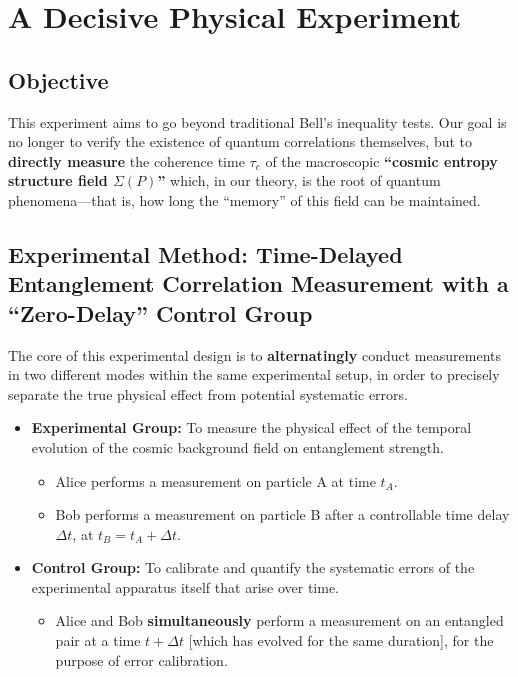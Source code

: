 \documentclass[11pt]{article}
\begin{document}
\section{A Decisive Physical Experiment}

\subsection{Objective}
This experiment aims to go beyond traditional Bell's inequality tests. Our goal is no longer to verify the existence of quantum correlations themselves, but to \textbf{directly measure} the coherence time $\tau_c$ of the macroscopic \textbf{``cosmic entropy structure field $\Sigma(P)$''} which, in our theory, is the root of quantum phenomena—that is, how long the ``memory'' of this field can be maintained.

\subsection{Experimental Method: Time-Delayed Entanglement Correlation Measurement with a ``Zero-Delay'' Control Group}
The core of this experimental design is to \textbf{alternatingly} conduct measurements in two different modes within the same experimental setup, in order to precisely separate the true physical effect from potential systematic errors.

\begin{itemize}
    \item   \textbf{Experimental Group:} To measure the physical effect of the temporal evolution of the cosmic background field on entanglement strength.
    \begin{itemize}
        \item   Alice performs a measurement on particle A at time $t_A$.
        \item   Bob performs a measurement on particle B after a controllable time delay $\Delta t$, at $t_B = t_A + \Delta t$.
    \end{itemize}

    \item   \textbf{Control Group:} To calibrate and quantify the systematic errors of the experimental apparatus itself that arise over time.
    \begin{itemize}
        \item   Alice and Bob \textbf{simultaneously} perform a measurement on an entangled pair at a time $t + \Delta t$ [which has evolved for the same duration], for the purpose of error calibration.
    \end{itemize}
\end{itemize}
\end{document}
